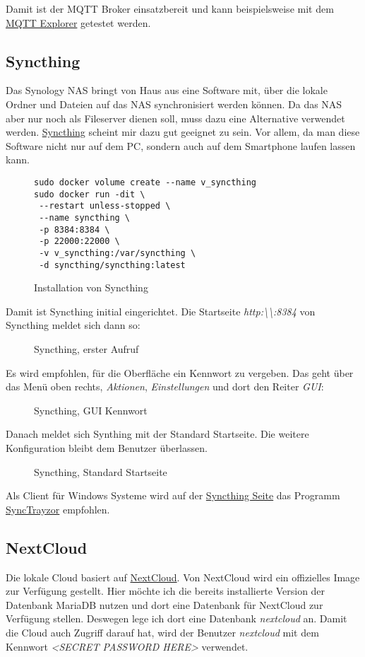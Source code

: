 \documentclass[12pt,a4paper,ngerman]{article}
\newcommand{\code}[1]{\textit{#1}}
\newcommand{\jpaimg}[2]{\begin{figure}[H]\centering\fbox{\texttt{[image: \#1]}}\caption{#2}\label{fig:#2}\end{figure}}
\newcommand{\jpacaption}[1]{\caption{#1}\label{fig:#1}}
\begin{document}
Damit ist der MQTT Broker einsatzbereit und kann beispielsweise mit dem
\href{https://mqtt-explorer.com/}{MQTT Explorer} getestet werden.

\subsection{Syncthing}
Das Synology NAS bringt von Haus aus eine Software mit, über die lokale Ordner
und Dateien auf das NAS synchronisiert werden können. Da das NAS aber nur noch
als Fileserver dienen soll, muss dazu eine Alternative verwendet werden.
\href{https://syncthing.net/}{Syncthing} scheint mir dazu gut geeignet zu sein.
Vor allem, da man diese Software nicht nur auf dem PC, sondern auch auf dem
Smartphone laufen lassen kann.

\begin{figure}[H]
    \begin{lstlisting}
sudo docker volume create --name v_syncthing
sudo docker run -dit \
 --restart unless-stopped \
 --name syncthing \
 -p 8384:8384 \
 -p 22000:22000 \
 -v v_syncthing:/var/syncthing \
 -d syncthing/syncthing:latest
\end{lstlisting}
    \jpacaption{Installation von Syncthing}
\end{figure}

Damit ist Syncthing initial eingerichtet. Die Startseite
\code{http:\textbackslash\textbackslash<IP OF SERVER>:8384} von Syncthing meldet
sich dann so:

\jpaimg{./images/Syncthing-01.png}{Syncthing, erster Aufruf}

Es wird empfohlen, für die Oberfläche ein Kennwort zu vergeben. Das geht über
das Menü oben rechts, \code{Aktionen}, \code{Einstellungen} und dort den Reiter
\code{GUI}:

\jpaimg{./images/Syncthing-02.png}{Syncthing, GUI Kennwort}

Danach meldet sich Synthing mit der Standard Startseite. Die weitere
Konfiguration bleibt dem Benutzer überlassen.

\jpaimg{./images/Syncthing-03.png}{Syncthing, Standard Startseite}

Als Client für Windows Systeme wird auf der
\href{https://syncthing.net/}{Syncthing Seite} das Programm
\href{https://github.com/canton7/SyncTrayzor}{SyncTrayzor} empfohlen.

\subsection{NextCloud}
Die lokale Cloud basiert auf \href{https://nextcloud.com/}{NextCloud}. Von
NextCloud wird ein offizielles Image zur Verfügung gestellt. Hier möchte ich
die bereits installierte Version der Datenbank MariaDB nutzen und dort eine
Datenbank für NextCloud zur Verfügung stellen. Deswegen lege ich dort eine
Datenbank \code{nextcloud} an. Damit die Cloud auch Zugriff darauf hat, wird
der Benutzer \code{nextcloud} mit dem Kennwort \code{<SECRET PASSWORD HERE>}
verwendet.
\end{document}
